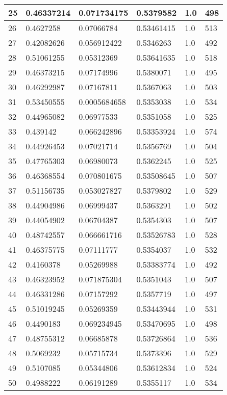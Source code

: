 \begin{longtable}{|l|l|l|l|l|l|}
25 & 0.46337214 & 0.071734175 & 0.5379582 & 1.0 & 498 \\ \hline 
26 & 0.4627258 & 0.07066784 & 0.53461415 & 1.0 & 513 \\ \hline 
27 & 0.42082626 & 0.056912422 & 0.5346263 & 1.0 & 492 \\ \hline 
28 & 0.51061255 & 0.05312369 & 0.53641635 & 1.0 & 518 \\ \hline 
29 & 0.46373215 & 0.07174996 & 0.5380071 & 1.0 & 495 \\ \hline 
30 & 0.46292987 & 0.07167811 & 0.5367063 & 1.0 & 503 \\ \hline 
31 & 0.53450555 & 0.0005684658 & 0.5353038 & 1.0 & 534 \\ \hline 
32 & 0.44965082 & 0.06977533 & 0.5351058 & 1.0 & 525 \\ \hline 
33 & 0.439142 & 0.066242896 & 0.53353924 & 1.0 & 574 \\ \hline 
34 & 0.44926453 & 0.07021714 & 0.5356769 & 1.0 & 504 \\ \hline 
35 & 0.47765303 & 0.06980073 & 0.5362245 & 1.0 & 525 \\ \hline 
36 & 0.46368554 & 0.070801675 & 0.53508645 & 1.0 & 507 \\ \hline 
37 & 0.51156735 & 0.053027827 & 0.5379802 & 1.0 & 529 \\ \hline 
38 & 0.44904986 & 0.06999437 & 0.5363291 & 1.0 & 502 \\ \hline 
39 & 0.44054902 & 0.06704387 & 0.5354303 & 1.0 & 507 \\ \hline 
40 & 0.48742557 & 0.066661716 & 0.53526783 & 1.0 & 528 \\ \hline 
41 & 0.46375775 & 0.07111777 & 0.5354037 & 1.0 & 532 \\ \hline 
42 & 0.4160378 & 0.05269988 & 0.53383774 & 1.0 & 492 \\ \hline 
43 & 0.46323952 & 0.071875304 & 0.5351043 & 1.0 & 507 \\ \hline 
44 & 0.46331286 & 0.07157292 & 0.5357719 & 1.0 & 497 \\ \hline 
45 & 0.51019245 & 0.05269359 & 0.53443944 & 1.0 & 531 \\ \hline 
46 & 0.4490183 & 0.069234945 & 0.53470695 & 1.0 & 498 \\ \hline 
47 & 0.48755312 & 0.06685878 & 0.53726864 & 1.0 & 536 \\ \hline 
48 & 0.5069232 & 0.05715734 & 0.5373396 & 1.0 & 529 \\ \hline 
49 & 0.5107085 & 0.05344806 & 0.53612834 & 1.0 & 524 \\ \hline 
50 & 0.4988222 & 0.06191289 & 0.5355117 & 1.0 & 534 \\ \hline 
\end{longtable}
